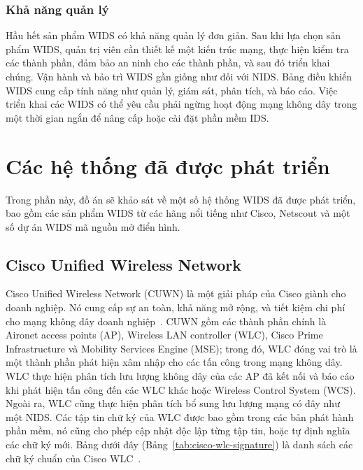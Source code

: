\subsubsection{Khả năng quản lý}
Hầu hết sản phẩm WIDS có khả năng quản lý đơn giản. Sau khi lựa chọn sản phẩm WIDS, quản trị viên cần thiết kế một kiến trúc mạng, thực hiện kiểm tra các thành phần, đảm bảo an ninh cho các thành phần, và sau đó triển khai chúng. Vận hành và bảo trì WIDS gần giống như đối với NIDS. Bảng điều khiển WIDS cung cấp tính năng như quản lý, giám sát, phân tích, và báo cáo. Việc triển khai các WIDS có thể yêu cầu phải ngừng hoạt động mạng không dây trong một thời gian ngắn để nâng cấp hoặc cài đặt phần mềm IDS.

\section{Các hệ thống đã được phát triển}
Trong phần này, đồ án sẽ khảo sát về một số hệ thống WIDS đã được phát triển, bao gồm các sản phẩm WIDS từ các hãng nổi tiếng như Cisco, Netscout và một số dự án WIDS mã nguồn mở điển hình.

\subsection{Cisco Unified Wireless Network}
Cisco Unified Wireless Network (CUWN) là một giải pháp của Cisco giành cho doanh nghiệp. Nó cung cấp sự an toàn, khả năng mở rộng, và tiết kiệm chi phí cho mạng không dây doanh nghiệp~\cite{cisco2015enterprise}. CUWN gồm các thành phần chính là Aironet access points (AP), Wireless LAN controller (WLC), Cisco Prime Infrastructure và Mobility Services Engine (MSE); trong đó, WLC đóng vai trò là một thành phần phát hiện xâm nhập cho các tấn công trong mạng không dây. WLC thực hiện phân tích lưu lượng không dây của các AP đã kết nối và báo cáo khi phát hiện tấn công đến các WLC khác hoặc Wireless Control System (WCS). Ngoài ra, WLC cũng thực hiện phân tích bổ sung lưu lượng mạng có dây như một NIDS. Các tập tin chữ ký của WLC được bao gồm trong các bản phát hành phần mềm, nó cũng cho phép cập nhật độc lập từng tập tin, hoặc tự định nghĩa các chữ ký mới. Bảng dưới đây (Bảng~\ref{tab:cisco-wlc-signature}) là danh sách các chữ ký chuẩn của Cisco WLC~\cite{cisco2015enterprise}.

